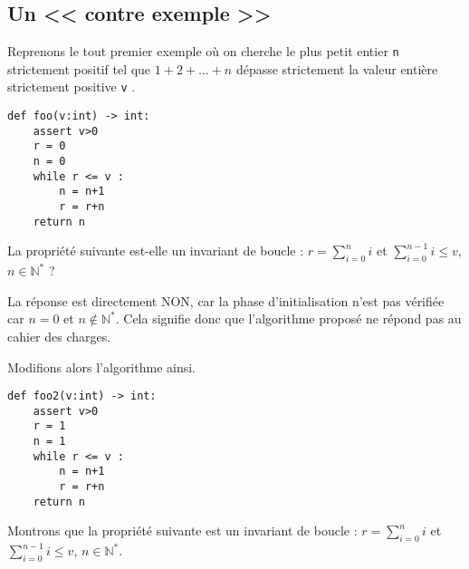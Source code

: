 \subsection{Un << contre exemple >>}


Reprenons le tout premier exemple où on cherche le plus petit entier \texttt{n} strictement positif tel que $1 + 2 + . . . + n$ dépasse strictement la valeur entière strictement positive \texttt{v} .
\begin{lstlisting}
def foo(v:int) -> int:
    assert v>0
    r = 0
    n = 0
    while r <= v : 
        n = n+1
        r = r+n
    return n
\end{lstlisting}

La propriété suivante est-elle un invariant de boucle : 
$r=\sum\limits_{i=0}^n i$ et 
$\sum\limits_{i=0}^{n-1} i \leq v$, 
$n\in\mathbb{N}^*$ ?

La réponse est directement NON, car la phase d'initialisation n'est pas vérifiée car $n=0$ et $n\notin\mathbb{N}^*$.
Cela signifie donc que l'algorithme proposé ne répond pas au cahier des charges. 

Modifions alors l'algorithme ainsi.
\begin{lstlisting}
def foo2(v:int) -> int:
    assert v>0
    r = 1
    n = 1
    while r <= v : 
        n = n+1
        r = r+n
    return n
\end{lstlisting}

Montrons que la propriété suivante est un invariant de boucle : $r=\sum\limits_{i=0}^n i$ et 
$\sum\limits_{i=0}^{n-1} i \leq v$, 
$n\in\mathbb{N}^*$.

